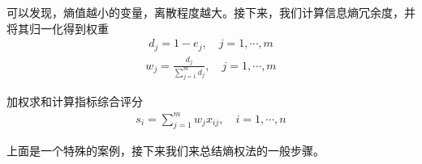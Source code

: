 \documentclass[letterpaper,10pt,english]{sphinxmanual}
\begin{document}
可以发现，熵值越小的变量，离散程度越大。接下来，我们计算信息熵冗余度，并将其归一化得到权重
\begin{equation*}
\begin{split}
d_{j}=1-e_{j}, \quad j=1, \cdots, m
\end{split}
\end{equation*}\begin{equation*}
\begin{split}
w_{j}=\frac{d_{j}}{\displaystyle\sum_{j=1}^{m} d_{j}}, \quad j=1, \cdots, m
\end{split}
\end{equation*}

加权求和计算指标综合评分
\begin{equation*}
\begin{split}
s_{i}=\sum_{j=1}^{m} w_{j} x_{i j}, \quad i=1, \cdots, n
\end{split}
\end{equation*}

上面是一个特殊的案例，接下来我们来总结熵权法的一般步骤。
\end{document}
